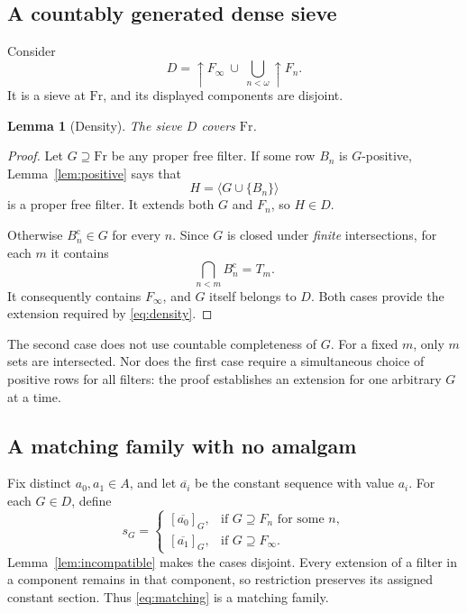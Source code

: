 \documentclass[11pt,letterpaper]{article}
\newtheorem{lemma}[theorem]{Lemma}
\theoremstyle{definition}
\theoremstyle{remark}
\newcommand{\om}{\omega}
\newcommand{\Fr}{\mathrm{Fr}}
\newcommand{\gen}[1]{\langle #1\rangle}
\newcommand{\co}{\mathrm c}
\newcommand{\const}[1]{\overline{#1}}
\begin{document}
\subsection{A countably generated dense sieve}
Consider
\begin{equation}\label{eq:D}
 D=\uparrow F_\infty\ \cup\ \bigcup_{n<\om}\uparrow F_n.
\end{equation}
It is a sieve at $\Fr$, and its displayed components are disjoint.

\begin{lemma}[Density]\label{lem:dense}
The sieve $D$ covers $\Fr$.
\end{lemma}
\begin{proof}
Let $G\supseteq\Fr$ be any proper free filter. If some row $B_n$ is
$G$-positive, Lemma~\ref{lem:positive} says that
\[
 H=\gen{G\cup\{B_n\}}
\]
is a proper free filter. It extends both $G$ and $F_n$, so $H\in D$.

Otherwise $B_n^\co\in G$ for every $n$. Since $G$ is closed under
\emph{finite} intersections, for each $m$ it contains
\[
 \bigcap_{n<m}B_n^\co=T_m.
\]
It consequently contains $F_\infty$, and $G$ itself belongs to $D$.
Both cases provide the extension required by \eqref{eq:density}.
\end{proof}

The second case does not use countable completeness of $G$. For a fixed
$m$, only $m$ sets are intersected. Nor does the first case require a
simultaneous choice of positive rows for all filters: the proof establishes
an extension for one arbitrary $G$ at a time.

\subsection{A matching family with no amalgam}
Fix distinct $a_0,a_1\in A$, and let $\const{a_i}$ be the constant
sequence with value $a_i$. For each $G\in D$, define
\begin{equation}\label{eq:matching}
 s_G=
 \begin{cases}
  [\const{a_0}]_G,&\text{if }G\supseteq F_n\text{ for some }n,\\
  [\const{a_1}]_G,&\text{if }G\supseteq F_\infty.
 \end{cases}
\end{equation}
Lemma~\ref{lem:incompatible} makes the cases disjoint. Every extension
of a filter in a component remains in that component, so restriction
preserves its assigned constant section. Thus \eqref{eq:matching} is a
matching family.
\end{document}
